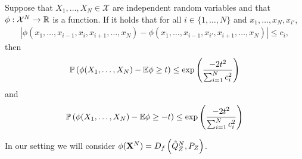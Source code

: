 \begin{theorem}\label{thm:mcdiarmid}
Suppose that $X_1, \ldots, X_N \in \mathcal{X}$ are independent random variables and that $\phi : \mathcal{X}^N \to \mathbb{R}$ is a function. 
If it holds that for all $i\in\{1,\ldots,N\}$ and $x_1, \ldots, x_N, x_{i'}$, 
\begin{align*}
    \left| \phi(x_1, \ldots, x_{i-1}, x_i, x_{i+1}, \ldots, x_N) - \phi(x_1, \ldots, x_{i-1}, x_{i'}, x_{i+1}, \ldots, x_N)\right| \leq c_i,
\end{align*}
then
\begin{align*}
    \mathbb{P} \left(\phi(X_1,\ldots, X_N) - \mathbb{E}\phi \geq t \right) \leq \exp\left(\frac{-2t^2}{\sum_{i=1}^N c^2_i} \right)
\end{align*}
and
\begin{align*}
    \mathbb{P} \left(\phi(X_1,\ldots, X_N) - \mathbb{E}\phi \geq -t \right) \leq \exp\left(\frac{-2t^2}{\sum_{i=1}^N c^2_i} \right)
\end{align*}
\end{theorem}

In our setting we will consider $\phi(\mathbf{X}^N) = D_f\left( \hat{Q}_Z^N , P_Z\right)$.


